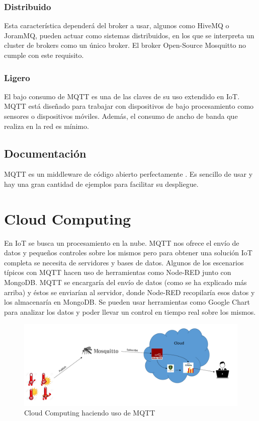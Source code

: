 \documentclass[12pt, twoside]{book}
\newcommand{\MYhref}[3][blue]{\href{#2}{\color{#1}{#3}}}
\begin{document}
\subsubsection*{Distribuido}
Esta característica dependerá del broker a usar, algunos como HiveMQ o JoramMQ, pueden actuar como sistemas distribuidos, en los que se interpreta un cluster de brokers como un único broker.
El broker Open-Source Mosquitto no cumple con este requisito.

\subsubsection*{Ligero}
El bajo consumo de MQTT es una de las claves de su uso extendido en IoT. MQTT está diseñado para trabajar con dispositivos de bajo procesamiento como sensores o dispositivos móviles. Además, el consumo de ancho de banda que realiza en la red es mínimo. 

\subsection{Documentación}
MQTT es un middleware de código abierto perfectamente
\MYhref{http://docs.oasis-open.org/mqtt/mqtt/v3.1.1/mqtt-v3.1.1.html}{documentado}. Es sencillo de usar y hay una gran cantidad de ejemplos para facilitar su despliegue.\\

 
\section{Cloud Computing}
En IoT se busca un procesamiento en la nube. MQTT nos ofrece el envío de datos y pequeños controles sobre los mismos pero para obtener una solución IoT completa se necesita de servidores y bases de datos. Algunos de los escenarios típicos con MQTT hacen uso de herramientas como Node-RED\cite{nodered} junto con MongoDB\cite{mongo}. MQTT se encargaría del envío de datos (como se ha explicado más arriba) y éstos se enviarían al servidor, donde Node-RED recopilaría esos datos y los almacenaría en MongoDB. Se pueden usar herramientas como Google Chart para analizar los datos y poder llevar un control en tiempo real sobre los mismos. 
\begin{figure}[H]
\centering
\includegraphics[scale=0.4]{images/cloud_mqtt1}
\caption{Cloud Computing haciendo uso de MQTT}\label{L408}
\end{figure}
\end{document}
